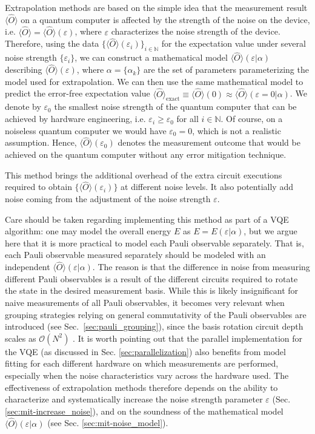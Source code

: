 Extrapolation methods are based on the simple idea that the measurement result $\langle \hat{O} \rangle$ on a quantum computer is affected by the strength of the noise on the device, i.e. $\langle \hat{O} \rangle= \langle \hat{O} \rangle( \varepsilon )$, where $\varepsilon$ characterizes the noise strength of the device. Therefore, using the data $\{ \langle \hat{O} \rangle (\varepsilon _{i})\}_{i\in \mathbb{N}}$ for the expectation value under several noise strength $ \{\varepsilon _{i}\}$, we can construct a mathematical model $ \langle \hat{O} \rangle ( \varepsilon |\alpha )$ describing $ \langle \hat{O} \rangle ( \varepsilon )$, where $\alpha =\{\alpha _{k}\}$ are the set of parameters parameterizing the model used for extrapolation. We can then use the same mathematical model to predict the error-free expectation value $ \langle \hat{O} \rangle_{\mathrm{exact}} \equiv \langle \hat{O} \rangle (0) \approx \langle \hat{O} \rangle ( \varepsilon =0|\alpha )$. We denote by $\varepsilon_{0}$ the smallest noise strength of the quantum computer that can be achieved by hardware engineering, i.e. $\varepsilon _{i} \geqslant \varepsilon _{0}$ for all $i\in \mathbb{N}$. Of course, on a noiseless quantum computer we would have $\varepsilon_{0}=0$, which is not a realistic assumption. Hence, $ \langle \hat{O} \rangle ( \varepsilon _{0})$ denotes the measurement outcome that would be achieved on the quantum computer without any error mitigation technique.

This method brings the additional overhead of the extra circuit executions required to obtain $\{ \langle \hat{O} \rangle ( \varepsilon _{i})\}$ at different noise levels. It also potentially add noise coming from the adjustment of the noise strength $\varepsilon$.

Care should be taken regarding implementing this method as part of a VQE algorithm: one may model the overall energy $E$ as $E=E(\varepsilon|\alpha)$, but we argue here that it is more practical to model each Pauli observable separately. That is, each Pauli observable measured separately should be modeled with an independent $ \langle \hat{O} \rangle (\varepsilon|\alpha)$.
The reason is that the difference in noise from measuring different Pauli observables is a result of the different circuits required to rotate the state in the desired measurement basis. While this is likely insignificant for naive measurements of all Pauli observables, it becomes very relevant when grouping strategies relying on general commutativity of the Pauli observables are introduced (see Sec.~\ref{sec:pauli_grouping}), since the basis rotation circuit depth scales as $\mathcal{O}(N^2)$ \cite{Gokhale2019_long}. 
It is worth pointing out that the parallel implementation for the VQE (as discussed in Sec. \ref{sec:parallelization}) also benefits from model fitting for each different hardware on which measurements are performed,
especially when the noise characteristics vary across the hardware used.
The effectiveness of extrapolation methods therefore depends on the ability to characterize and systematically increase the noise strength parameter $\varepsilon $ (Sec. \ref{sec:mit-increase_noise}), and on the soundness of the mathematical model $\langle \hat{O} \rangle( \varepsilon |\alpha )$ (see Sec. \ref{sec:mit-noise_model}).

